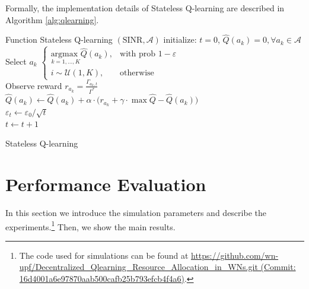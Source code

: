 \documentclass[conference]{IEEEtran}
\begin{document}
	Formally, the implementation details of Stateless Q-learning are described in Algorithm \ref{alg:qlearning}.
	\begin{algorithm}
		Function Stateless Q-learning $(\text{SINR},\mathcal{A})$\;
		initialize: $t=0$, $\hat{Q}(a_k) = 0, \forall a_k \in \mathcal{A}$\\
		{
			Select $a_k$  $\begin{cases}
			\underset{k=1,...,K}{\text{argmax }} \hat{Q}(a_k), & \text{with prob } 1 - \varepsilon\\
			i \sim \mathcal{U}(1, K), & \text{otherwise}
			\end{cases}$\\
			Observe reward $r_{a_k} = \frac{\Gamma_{a_k,t}}{\Gamma^*}$ \\
			$\hat{Q}(a_k) \leftarrow \hat{Q}(a_k) + \alpha \cdot \big(r_{a_k} + \gamma \cdot \max\hat{Q} - \hat{Q}(a_k)\big)$\\
			$\varepsilon_t \leftarrow \varepsilon_0 / \sqrt{t}$ \\	
			$ t \leftarrow t + 1$
		}
		\caption{Stateless Q-learning}
		\label{alg:qlearning}
	\end{algorithm}
	
	\section{Performance Evaluation}
	\label{section:performance_evaluation}	
	In this section we introduce the simulation parameters and describe the experiments.\footnote{The code used for simulations can be found at \url{https://github.com/wn-upf/Decentralized_Qlearning_Resource_Allocation_in_WNs.git (Commit: 16d4001a6e97870aab500cafb25b793efcb4f4a6)}.} Then, we show the main results.
	
\end{document}
